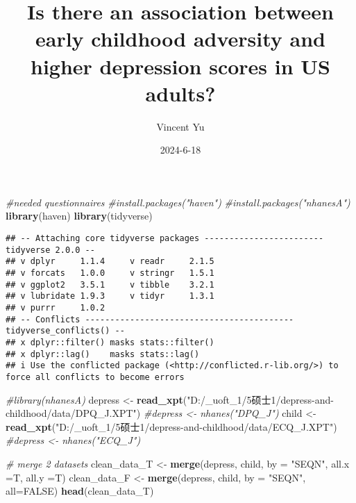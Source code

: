 \documentclass[
]{article}
\title{Is there an association between early childhood adversity and
higher depression scores in US adults?}
\author{Vincent Yu}
\date{2024-6-18}
\newenvironment{Shaded}{\begin{snugshade}}{\end{snugshade}}
\newcommand{\AttributeTok}[1]{\textcolor[rgb]{0.13,0.29,0.53}{#1}}
\newcommand{\CommentTok}[1]{\textcolor[rgb]{0.56,0.35,0.01}{\textit{#1}}}
\newcommand{\ConstantTok}[1]{\textcolor[rgb]{0.56,0.35,0.01}{#1}}
\newcommand{\FunctionTok}[1]{\textcolor[rgb]{0.13,0.29,0.53}{\textbf{#1}}}
\newcommand{\NormalTok}[1]{#1}
\newcommand{\OtherTok}[1]{\textcolor[rgb]{0.56,0.35,0.01}{#1}}
\newcommand{\StringTok}[1]{\textcolor[rgb]{0.31,0.60,0.02}{#1}}
\begin{document}
\maketitle

\begin{Shaded}
\begin{Highlighting}[]
\CommentTok{\#needed questionnaires}
\CommentTok{\#install.packages("haven")}
\CommentTok{\#install.packages("nhanesA")}
\FunctionTok{library}\NormalTok{(haven)}
\FunctionTok{library}\NormalTok{(tidyverse)}
\end{Highlighting}
\end{Shaded}

\begin{verbatim}
## -- Attaching core tidyverse packages ------------------------ tidyverse 2.0.0 --
## v dplyr     1.1.4     v readr     2.1.5
## v forcats   1.0.0     v stringr   1.5.1
## v ggplot2   3.5.1     v tibble    3.2.1
## v lubridate 1.9.3     v tidyr     1.3.1
## v purrr     1.0.2     
## -- Conflicts ------------------------------------------ tidyverse_conflicts() --
## x dplyr::filter() masks stats::filter()
## x dplyr::lag()    masks stats::lag()
## i Use the conflicted package (<http://conflicted.r-lib.org/>) to force all conflicts to become errors
\end{verbatim}

\begin{Shaded}
\begin{Highlighting}[]
\CommentTok{\#library(nhanesA)}
\NormalTok{depress }\OtherTok{\textless{}{-}} \FunctionTok{read\_xpt}\NormalTok{(}\StringTok{"D:/\_uoft\_1/5硕士1/depress{-}and{-}childhood/data/DPQ\_J.XPT"}\NormalTok{)}
\CommentTok{\#depress \textless{}{-} nhanes("DPQ\_J")}
\NormalTok{child }\OtherTok{\textless{}{-}} \FunctionTok{read\_xpt}\NormalTok{(}\StringTok{"D:/\_uoft\_1/5硕士1/depress{-}and{-}childhood/data/ECQ\_J.XPT"}\NormalTok{)}
\CommentTok{\#depress \textless{}{-} nhanes("ECQ\_J")}
\end{Highlighting}
\end{Shaded}

\begin{Shaded}
\begin{Highlighting}[]
\CommentTok{\# merge 2 datasets}
\NormalTok{clean\_data\_T }\OtherTok{\textless{}{-}} \FunctionTok{merge}\NormalTok{(depress, child, }\AttributeTok{by =} \StringTok{"SEQN"}\NormalTok{, }\AttributeTok{all.x =}\NormalTok{T, }\AttributeTok{all.y =}\NormalTok{T)}
\NormalTok{clean\_data\_F }\OtherTok{\textless{}{-}} \FunctionTok{merge}\NormalTok{(depress, child, }\AttributeTok{by =} \StringTok{"SEQN"}\NormalTok{, }\AttributeTok{all=}\ConstantTok{FALSE}\NormalTok{)}
\FunctionTok{head}\NormalTok{(clean\_data\_T)}
\end{Highlighting}
\end{Shaded}
\end{document}
